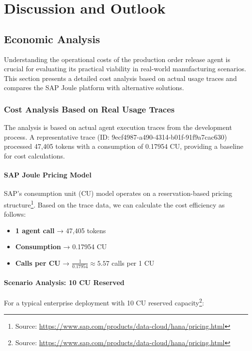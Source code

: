 \chapter{Discussion and Outlook}
\label{chap:Discussion}

\section{Economic Analysis}

Understanding the operational costs of the production order release agent is crucial for evaluating its practical viability in real-world manufacturing scenarios. This section presents a detailed cost analysis based on actual usage traces and compares the SAP Joule platform with alternative solutions.

\subsection{Cost Analysis Based on Real Usage Traces}

The analysis is based on actual agent execution traces from the development process. A representative trace (ID: 9ecf4987-a490-4314-b01f-91f9a7cac630) processed 47,405 tokens with a consumption of 0.17954 CU, providing a baseline for cost calculations.

\subsubsection{SAP Joule Pricing Model}

SAP's consumption unit (CU) model operates on a reservation-based pricing structure\footnote{Source: \url{https://www.sap.com/products/data-cloud/hana/pricing.html}}. Based on the trace data, we can calculate the cost efficiency as follows:

\begin{itemize}
    \item \textbf{1 agent call} → 47,405 tokens
    \item \textbf{Consumption} → 0.17954 CU
    \item \textbf{Calls per CU} → $\frac{1}{0.17954} \approx 5.57$ calls per 1 CU
\end{itemize}

\subsubsection{Scenario Analysis: 10 CU Reserved}

For a typical enterprise deployment with 10 CU reserved capacity\footnote{Source: \url{https://www.sap.com/products/data-cloud/hana/pricing.html}}:

